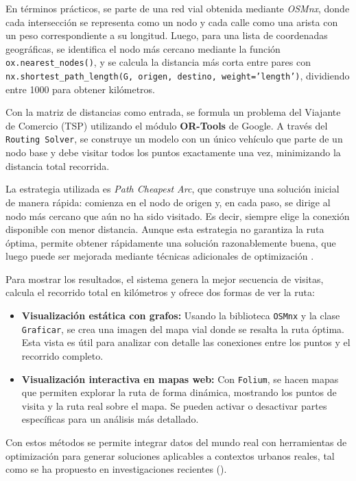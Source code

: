 \documentclass[a4paper,12pt]{article}
\begin{document}
En términos prácticos, se parte de una red vial obtenida mediante \textit{OSMnx}, donde cada intersección se representa como un nodo y cada calle como una arista con un peso correspondiente a su longitud. Luego, para una lista de coordenadas geográficas, se identifica el nodo más cercano mediante la función \texttt{ox.nearest\_nodes()}, y se calcula la distancia más corta entre pares con \texttt{nx.shortest\_path\_length(G, origen, destino, weight='length')}, dividiendo entre 1000 para obtener kilómetros.

Con la matriz de distancias como entrada, se formula un problema del Viajante de Comercio (TSP) utilizando el módulo \textbf{OR-Tools} de Google. A través del \texttt{Routing Solver}, se construye un modelo con un único vehículo que parte de un nodo base y debe visitar todos los puntos exactamente una vez, minimizando la distancia total recorrida.

La estrategia utilizada es \textit{Path Cheapest Arc}, que construye una solución inicial de manera rápida: comienza en el nodo de origen y, en cada paso, se dirige al nodo más cercano que aún no ha sido visitado. Es decir, siempre elige la conexión disponible con menor distancia. Aunque esta estrategia no garantiza la ruta óptima, permite obtener rápidamente una solución razonablemente buena, que luego puede ser mejorada mediante técnicas adicionales de optimización \cite{ortools_path_cheapest_arc}.




Para mostrar los resultados, el sistema genera la mejor secuencia de visitas, calcula el recorrido total en kilómetros y ofrece dos formas de ver la ruta:

\begin{itemize}
    \item \textbf{Visualización estática con grafos:} Usando la biblioteca \texttt{OSMnx} y la clase \texttt{Graficar}, se crea una imagen del mapa vial donde se resalta la ruta óptima. Esta vista es útil para analizar con detalle las conexiones entre los puntos y el recorrido completo.
    \item \textbf{Visualización interactiva en mapas web:} Con \texttt{Folium}, se hacen mapas que permiten explorar la ruta de forma dinámica, mostrando los puntos de visita y la ruta real sobre el mapa. Se pueden activar o desactivar partes específicas para un análisis más detallado.
\end{itemize}

Con estos métodos se permite integrar datos del mundo real con herramientas de optimización para generar soluciones aplicables a contextos urbanos reales, tal como se ha propuesto en investigaciones recientes (\cite{munoz2024, google2023, castro2022, boeing2025, hagberg2008}).
\end{document}
